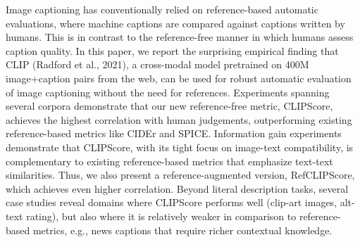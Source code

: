 Image captioning has conventionally relied on reference-based automatic evaluations, where machine captions are compared against captions written by humans. This is in contrast to the reference-free manner in which humans assess caption quality. In this paper, we report the surprising empirical finding that CLIP (Radford et al., 2021), a cross-modal model pretrained on 400M image+caption pairs from the web, can be used for robust automatic evaluation of image captioning without the need for references. Experiments spanning several corpora demonstrate that our new reference-free metric, CLIPScore, achieves the highest correlation with human judgements, outperforming existing reference-based metrics like CIDEr and SPICE. Information gain experiments demonstrate that CLIPScore, with its tight focus on image-text compatibility, is complementary to existing reference-based metrics that emphasize text-text similarities. Thus, we also present a reference-augmented version, RefCLIPScore, which achieves even higher correlation. Beyond literal description tasks, several case studies reveal domains where CLIPScore performs well (clip-art images, alt-text rating), but also where it is relatively weaker in comparison to reference-based metrics, e.g., news captions that require richer contextual knowledge.
